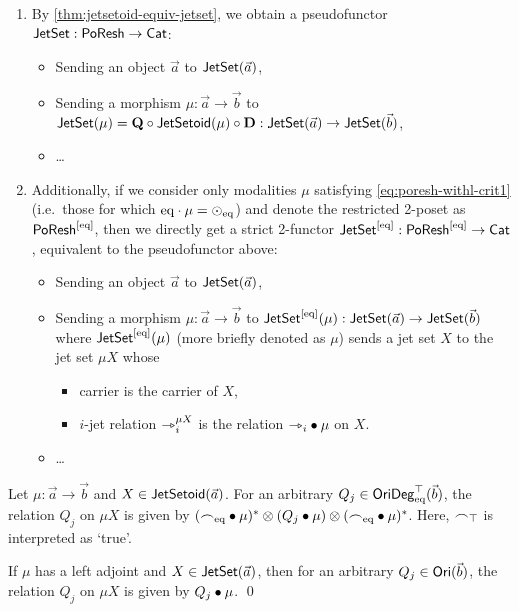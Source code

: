 \documentclass[a4paper]{memoir}
\begin{document}
\begin{definition}
\begin{enumerate}
		\item By \cref{thm:jetsetoid-equiv-jetset}, we obtain a pseudofunctor $\mathsf{JetSet} : \mathsf{PoResh} \to {\mathsf{Cat}}$:
		\begin{itemize}
			\item Sending an object $\vec a$ to $\mathsf{JetSet}(\vec a)$,
			\item Sending a morphism $\mu : \vec a \to \vec b$ to $\mathsf{JetSet}(\mu) = {\mathbf{Q}} \circ \mathsf{JetSetoid}(\mu) \circ {\mathbf{D}} : \mathsf{JetSet}(\vec a) \to \mathsf{JetSet}(\vec b)$,
			\item \ldots
		\end{itemize}
		
		\item Additionally, if we consider only modalities $\mu$ satisfying \cref{eq:poresh-withl-crit1} (i.e.\ those for which ${\mathrm{eq}} \cdot \mu = {\odot}_{\mathrm{eq}}$) and denote the restricted 2-poset as $\mathsf{PoResh} ^{[{\mathrm{eq}}]}$, then we directly get a strict 2-functor $\mathsf{JetSet} ^{[{\mathrm{eq}}]} : \mathsf{PoResh} ^{[{\mathrm{eq}}]} \to {\mathsf{Cat}}$, equivalent to the pseudofunctor above:
		\begin{itemize}
			\item Sending an object $\vec a$ to $\mathsf{JetSet}(\vec a)$,
			\item Sending a morphism $\mu : \vec a \to \vec b$ to $\mathsf{JetSet}^{[{\mathrm{eq}}]}(\mu) : \mathsf{JetSet}(\vec a) \to \mathsf{JetSet}(\vec b)$ where $\mathsf{JetSet}^{[{\mathrm{eq}}]}(\mu)$ (more briefly denoted as $\mu$) sends a jet set $X$ to the jet set $\mu X$ whose
			\begin{itemize}
				\item carrier is the carrier of $X$,
				\item $i$-jet relation ${\rightarrowtriangle}_i^{\mu X}$ is the relation ${\rightarrowtriangle}_i \mathbin{\bullet} \mu$ on $X$.
			\end{itemize}
			\item \ldots
		\end{itemize}
	\end{enumerate}
\end{definition}
\begin{corollary} \label{thm:poresh-jetsetoid:bind}
	Let $\mu : \vec a \to \vec b$ and $X \in \mathsf{JetSetoid}(\vec a)$.
	For an arbitrary $Q_j \in \mathsf{OriDeg}_{\mathrm{eq}}^\top(\vec b)$, the relation $Q_j$ on $\mu X$ is given by $({\frown}_{{\mathrm{eq}}} \mathbin{\bullet} \mu)^* \otimes (Q_j \mathbin{\bullet} \mu) \otimes ({\frown}_{{\mathrm{eq}}} \mathbin{\bullet} \mu)^*$.
	Here, ${\frown}_\top$ is interpreted as `true'.
	
	If $\mu$ has a left adjoint and $X \in \mathsf{JetSet}(\vec a)$, then for an arbitrary $Q_j \in {\mathsf{Ori}}(\vec b)$, the relation $Q_j$ on $\mu X$ is given by  $Q_j \mathbin{\bullet} \mu$. \qed
\end{corollary}
\end{document}
